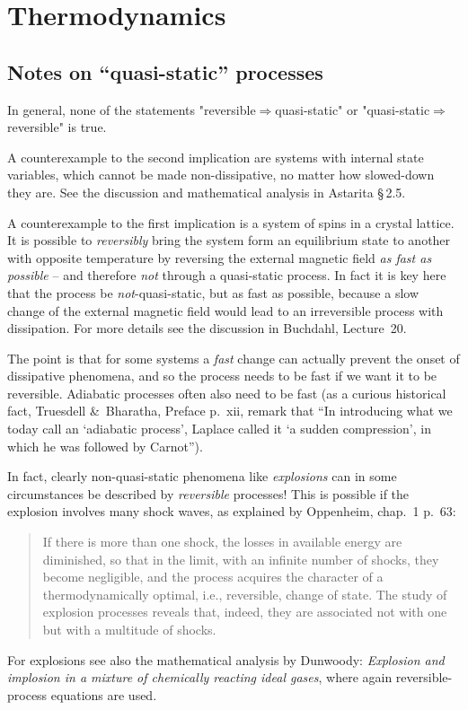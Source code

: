 \documentclass[a4paper,12pt,%
onecolumn,oneside,titlepage,%
british%
]{memoir}
\newcommand*{\amp}{\&}
\renewcommand*{\|}[1][]{\nonscript\:#1\vert\nonscript\:\mathopen{}}
\newcommand*{\sect}{\S}%
\begin{document}
\printpagenotes*
\clearpage

\chapter{Thermodynamics}
\label{ncha:thermodynamics}

\section{Notes on \enquote{quasi-static} processes}
\label{nsec:quasistatic}

In general, none of the statements "reversible${}\Rightarrow{}$quasi-static" or "quasi-static${}\Rightarrow{}$reversible"
is true.

A counterexample to the second implication are systems with internal state variables, which cannot be made non-dissipative, no matter how slowed-down they are. See the discussion and mathematical analysis in Astarita \sect\,2.5.


A counterexample to the first implication is a system of spins in a crystal lattice. It is possible to \emph{reversibly} bring the system form an equilibrium state to another with opposite temperature by reversing the external magnetic field \emph{as fast as possible} -- and therefore \emph{not} through a quasi-static process. In fact it is key here that the process be \emph{not}-quasi-static, but as fast as possible, because a slow change of the external magnetic field would lead to an irreversible process with dissipation. For more details see the discussion in Buchdahl, Lecture~20.

The point is that for some systems a \emph{fast} change can actually prevent the onset of dissipative phenomena, and so the process needs to be fast if we want it to be reversible. Adiabatic processes often also need to be fast (as a curious historical fact, Truesdell \amp\ Bharatha, Preface p.~xii, remark that \enquote{In introducing what we today call an `adiabatic process', Laplace called it `a sudden compression', in which he was followed by Carnot}).

In fact, clearly non-quasi-static phenomena like \emph{explosions} can in some circumstances be described by \emph{reversible} processes! This is possible if the explosion involves many shock waves, as explained by Oppenheim, chap.~1 p.~63:
\begin{quote}
  If there is more than one shock, the losses in available energy are diminished, so that in the limit, with an infinite number of shocks, they become negligible, and the process acquires the character of a thermodynamically optimal, i.e., reversible, change of state. The study of explosion processes reveals that, indeed, they are associated not with one but with a multitude of shocks.
\end{quote}
For explosions see also the mathematical analysis by Dunwoody: \emph{Explosion and implosion in a mixture of chemically reacting ideal gases}, where again reversible-process equations are used.
\end{document}
